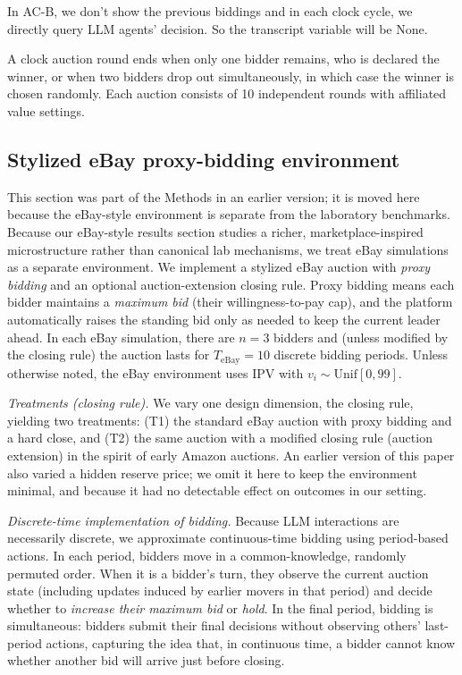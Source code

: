 \documentclass{article} %
\newif\ifmarkrev
\newcommand{\rev}[1]{\ifmarkrev\begingroup\color{red}#1\endgroup\else#1\fi}
\begin{document}
In AC-B, we don't show the previous biddings and in each clock cycle, we directly query LLM agents' decision.
So the transcript variable will be None.

A clock auction round ends when only one bidder remains, who is declared the winner, or when two bidders drop out simultaneously, in which case the winner is chosen randomly. Each auction consists of 10 independent rounds with affiliated value settings.



\subsection{\rev{Stylized eBay proxy-bidding environment}}\label{app:ebay_env}
\rev{This section was part of the Methods in an earlier version; it is moved here because the eBay-style environment is separate from the laboratory benchmarks.}
Because our eBay-style results section studies a richer, marketplace-inspired microstructure rather than canonical lab mechanisms, we treat eBay simulations as a separate environment. We implement a stylized eBay auction with \emph{proxy bidding} and an optional auction-extension closing rule. Proxy bidding means each bidder maintains a \emph{maximum bid} (their willingness-to-pay cap), and the platform automatically raises the standing bid only as needed to keep the current leader ahead. In each eBay simulation, there are $n=3$ bidders and (unless modified by the closing rule) the auction lasts for $T_{\text{eBay}}=10$ discrete bidding periods. Unless otherwise noted, the eBay environment uses IPV with $v_i \sim \mathrm{Unif}[0,99]$.

\emph{Treatments (closing rule).}
\rev{We vary one design dimension, the closing rule, yielding two treatments: (T1) the standard eBay auction with proxy bidding and a hard close, and (T2) the same auction with a modified closing rule (auction extension) in the spirit of early Amazon auctions. An earlier version of this paper also varied a hidden reserve price; we omit it here to keep the environment minimal, and because it had no detectable effect on outcomes in our setting.}

\emph{Discrete-time implementation of bidding.}
Because LLM interactions are necessarily discrete, we approximate continuous-time bidding using period-based actions. In each period, bidders move in a common-knowledge, randomly permuted order. When it is a bidder's turn, they observe the current auction state (including updates induced by earlier movers in that period) and decide whether to \emph{increase their maximum bid} or \emph{hold}. In the final period, bidding is simultaneous: bidders submit their final decisions without observing others' last-period actions, capturing the idea that, in continuous time, a bidder cannot know whether another bid will arrive just before closing.
\end{document}

